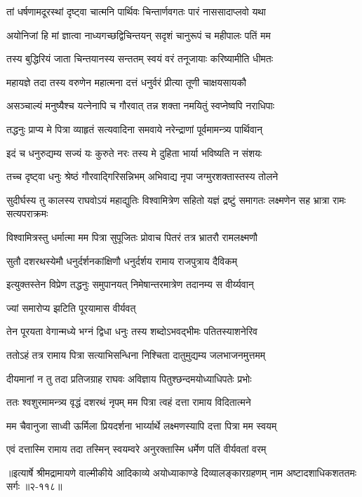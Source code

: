 \twolineshloka
{तां धर्षणामदूरस्थां दृष्ट्वा चात्मनि पार्थिवः}
{चिन्तार्णवगतः पारं नाससादाप्लवो यथा} %

\twolineshloka
{अयोनिजां हि मां ज्ञात्वा नाध्यगच्छद्विचिन्तयन्}
{सदृशं चानुरूपं च महीपालः पतिं मम} %

\twolineshloka
{तस्य बुद्धिरियं जाता चिन्तयानस्य सन्ततम्}
{स्वयं वरं तनूजायाः करिष्यामीति धीमतः} %

\twolineshloka
{महायज्ञे तदा तस्य वरुणेन महात्मना}
{दत्तं धनुर्वरं प्रीत्या तूणी चाक्षयसायकौ} %

\twolineshloka
{असञ्चाल्यं मनुष्यैश्च यत्नेनापि च गौरवात्}
{तन्न शक्ता नमयितुं स्वप्नेष्वपि नराधिपाः} %

\twolineshloka
{तद्धनुः प्राप्य मे पित्रा व्याहृतं सत्यवादिना}
{समवाये नरेन्द्राणां पूर्वमामन्त्र्य पार्थिवान्} %

\twolineshloka
{इदं च धनुरुद्यम्य सज्यं यः कुरुते नरः}
{तस्य मे दुहिता भार्या भविष्यति न संशयः} %

\twolineshloka
{तच्च दृष्ट्वा धनुः श्रेष्ठं गौरवाद्गिरिसन्निभम्}
{अभिवाद्य नृपा जग्मुरशक्तास्तस्य तोलने} %

\threelineshloka
{सुदीर्घस्य तु कालस्य राघवोऽयं महाद्युतिः}
{विश्वामित्रेण सहितो यज्ञं द्रष्टुं समागतः}
{लक्ष्मणेन सह भ्रात्रा रामः सत्यपराक्रमः} %

\twolineshloka
{विश्वामित्रस्तु धर्मात्मा मम पित्रा सुपूजितः}
{प्रोवाच पितरं तत्र भ्रातरौ रामलक्ष्मणौ} %

\twolineshloka
{सुतौ दशरथस्येमौ धनुर्दर्शनकांक्षिणौ}
{धनुर्दर्शय रामाय राजपुत्राय दैविकम्} %

\twolineshloka
{इत्युक्तस्तेन विप्रेण तद्धनुः समुपानयत्}
{निमेषान्तरमात्रेण तदानम्य स वीर्य्यवान्} %

\onelineshloka
{ज्यां समारोप्य झटिति पूरयामास वीर्यवत्} %

\twolineshloka
{तेन पूरयता वेगान्मध्ये भग्नं द्विधा धनुः}
{तस्य शब्दोऽभवद्भीमः पतितस्याशनेरिव} %

\twolineshloka
{ततोऽहं तत्र रामाय पित्रा सत्याभिसन्धिना}
{निश्चिता दातुमुद्यम्य जलभाजनमुत्तमम्} %

\twolineshloka
{दीयमानां न तु तदा प्रतिजग्राह राघवः}
{अविज्ञाय पितुश्छन्दमयोध्याधिपतेः प्रभोः} %

\twolineshloka
{ततः श्वशुरमामन्त्र्य वृद्धं दशरथं नृपम्}
{मम पित्रा त्वहं दत्ता रामाय विदितात्मने} %

\twolineshloka
{मम चैवानुजा साध्वी ऊर्मिला प्रियदर्शना}
{भार्य्यार्थे लक्ष्मणस्यापि दत्ता पित्रा मम स्वयम्} %

\twolineshloka
{एवं दत्तास्मि रामाय तदा तस्मिन् स्वयम्वरे}
{अनुरक्तास्मि धर्मेण पतिं वीर्यवतां वरम्} %


॥इत्यार्षे श्रीमद्रामायणे वाल्मीकीये आदिकाव्ये अयोध्याकाण्डे दिव्यालङ्कारग्रहणम् नाम अष्टादशाधिकशततमः सर्गः ॥२-११८॥
